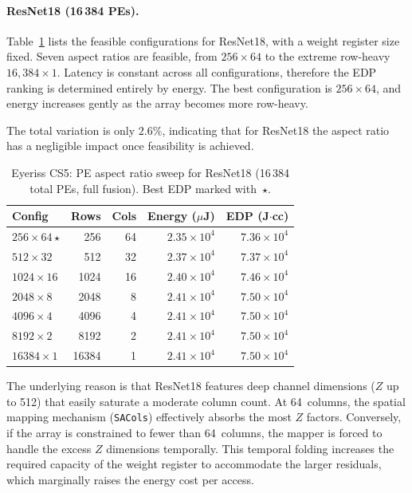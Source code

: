 \paragraph{ResNet18 (16\,384 PEs).}
Table~\ref{tab:eyeriss-cs5} lists the feasible configurations for
ResNet18, with a weight register size fixed.
Seven aspect ratios are feasible, from
$256 \times 64$ to the extreme row-heavy $16{,}384 \times 1$.
Latency is constant across all configurations, therefore the EDP ranking is determined entirely
by energy.
The best configuration is $256 \times 64$, and energy increases gently as
the array becomes more row-heavy.

The total variation is only $2.6\%$, indicating that for ResNet18 the
aspect ratio has a negligible impact once feasibility is achieved.

\begin{table}[htbp]
  \centering
  \caption{Eyeriss CS5: PE aspect ratio sweep for ResNet18
    (16\,384 total PEs, full fusion).
    Best EDP marked with~$\star$.}
  \label{tab:eyeriss-cs5}
  \begin{tabular}{lrrrr}
    \toprule
    Config & Rows & Cols & Energy ($\mu$J) & EDP (J$\cdot$cc) \\
    \midrule
    $256 \times 64$\,$\star$
           & 256   & 64  & $2.35 \times 10^{4}$ & $7.36 \times 10^{4}$ \\
    $512 \times 32$
           & 512   & 32  & $2.37 \times 10^{4}$ & $7.37 \times 10^{4}$ \\
    $1024 \times 16$
           & 1024  & 16  & $2.40 \times 10^{4}$ & $7.46 \times 10^{4}$ \\
    $2048 \times 8$
           & 2048  &  8  & $2.41 \times 10^{4}$ & $7.50 \times 10^{4}$ \\
    $4096 \times 4$
           & 4096  &  4  & $2.41 \times 10^{4}$ & $7.50 \times 10^{4}$ \\
    $8192 \times 2$
           & 8192  &  2  & $2.41 \times 10^{4}$ & $7.50 \times 10^{4}$ \\
    $16384 \times 1$
           &16384  &  1  & $2.41 \times 10^{4}$ & $7.50 \times 10^{4}$ \\
    \bottomrule
  \end{tabular}
\end{table}
The underlying reason is that ResNet18 features deep channel dimensions ($Z$ up to 512) that easily saturate a moderate column count. At 64~columns, the spatial mapping mechanism (\texttt{SACols}) effectively absorbs the most $Z$ factors. Conversely, if the array is constrained to fewer than 64~columns, the mapper is forced to handle the excess $Z$ dimensions temporally. This temporal folding increases the required capacity of the weight register to accommodate the larger residuals, which marginally raises the energy cost per access.

